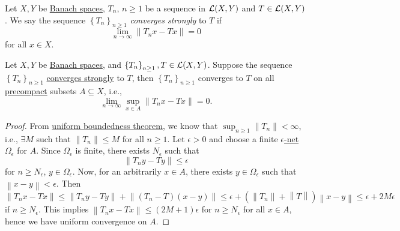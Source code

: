 \begin{definition}\label{def:strongly-convergence}
	Let \(X, Y\) be \hyperref[def:Banach-space]{Banach spaces}, \(T_n\), \(n \geq 1\) be a sequence in \(\mathcal{\MakeUppercase{l}} (X, Y)\) and \(T\in \mathcal{\MakeUppercase{l}} (X, Y)\). We say the sequence \(\left\{ T_n \right\} _{n \geq 1}\) \emph{converges strongly} to \(T\) if
	\[
		\lim_{n \to \infty} \left\lVert T_n x - Tx\right\rVert = 0
	\]
	for all \(x\in X\).
\end{definition}

\begin{lemma}\label{lma:lec16}
	Let \(X, Y\) be \hyperref[def:Banach-space]{Banach spaces}, and \(\left\{ T_n \right\} _{n \geq 1}, T\in \mathcal{\MakeUppercase{l}} (X, Y)\). Suppose the sequence \(\left\{ T_n \right\} _{n \geq 1}\) \hyperref[def:strongly-convergence]{converges strongly} to \(T\), then \(\left\{ T_n \right\}_{n \geq 1}\) converges to \(T\) on all \hyperref[def:precompact]{precompact} subsets \(A \subseteq X\), i.e.,
	\[
		\lim_{n \to \infty} \sup_{x\in A} \left\lVert T_n x - Tx\right\rVert = 0.
	\]
\end{lemma}
\begin{proof}
	From \hyperref[thm:uniform-boundedness]{uniform boundedness theorem}, we know that \(\sup _{n \geq 1} \left\lVert T_n\right\rVert < \infty \), i.e., \(\exists M\) such that \(\left\lVert T_n\right\rVert \leq M\) for all \(n \geq 1\). Let \(\epsilon > 0\) and choose a finite \hyperref[def:eps-net]{\(\epsilon \)-net} \(\Omega _\epsilon \)  for \(A\). Since \(\Omega _{\epsilon }\) is finite, there exists \(N_{\epsilon } \) such that
	\[
		\left\lVert T_n y - Ty\right\rVert \leq \epsilon
	\]
	for \(n \geq N_{\epsilon } \), \(y\in \Omega _{\epsilon }\). Now, for an arbitrarily \(x\in A\), there exists \(y\in \Omega _\epsilon \) such that \(\left\lVert x - y\right\rVert < \epsilon \). Then
	\[
		\left\lVert T_n x - Tx\right\rVert \leq \left\lVert T_n y - T y\right\rVert + \left\lVert (T_n - T)(x - y)\right\rVert \leq \epsilon + \left( \left\lVert T_n\right\rVert + \left\lVert T\right\rVert  \right) \left\lVert x - y \right\rVert \leq \epsilon + 2M\epsilon
	\]
	if \(n \geq N_{\epsilon } \). This implies \(\left\lVert T_n x - Tx\right\rVert \leq (2M+1)\epsilon \) for \(n \geq N_{\epsilon } \) for all \(x\in A\), hence we have uniform convergence on \(A\).
\end{proof}

